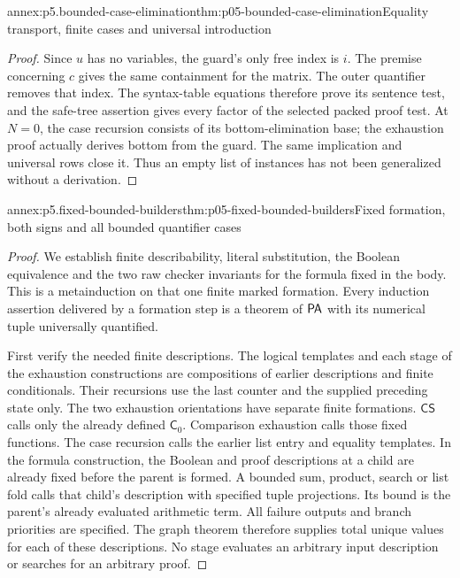 \begin{annexitem}{annex:p5.bounded-case-elimination}{thm:p05-bounded-case-elimination}{Equality transport, finite cases and universal introduction}
\begin{proof}
Since \(u\) has no variables, the guard's only free index is \(i\).
The premise concerning \(c\) gives the same containment for the
matrix. The outer quantifier removes that index. The syntax-table equations
therefore prove its sentence test, and the safe-tree assertion gives every
factor of the selected packed proof test. At \(N=0\), the case
recursion consists of its bottom-elimination base; the exhaustion proof
actually derives bottom from the guard. The same implication and universal
rows close it. Thus an empty list of instances has not been generalized
without a derivation.
\end{proof}
\end{annexitem}

\begin{annexitem}{annex:p5.fixed-bounded-builders}{thm:p05-fixed-bounded-builders}{Fixed formation, both signs and all bounded quantifier cases}
\begin{proof}
We establish finite describability, literal substitution, the Boolean
equivalence and the two raw checker invariants for the formula fixed in
the body. This is a metainduction on that one finite marked formation.
Every induction assertion delivered by a formation step is a theorem of
\(\mathsf{PA}\) with its numerical tuple universally quantified.

First verify the needed finite descriptions. The logical templates and
each stage of the exhaustion constructions are compositions of earlier
descriptions and finite conditionals. Their recursions use the last
counter and the supplied preceding state only. The two exhaustion
orientations have separate finite formations. \(\mathsf{CS}\)
calls only the already defined \(\mathsf C_0\). Comparison
exhaustion calls those fixed functions. The case recursion calls the
earlier list entry and equality templates. In the formula construction,
the Boolean and proof descriptions at a child are already fixed before
the parent is formed. A bounded sum, product, search or list fold calls
that child's description with specified tuple projections. Its bound is
the parent's already evaluated arithmetic term. All failure outputs and
branch priorities are specified. The graph theorem therefore supplies
total unique values for each of these descriptions. No stage evaluates
an arbitrary input description or searches for an arbitrary proof.


\end{proof}
\end{annexitem}
